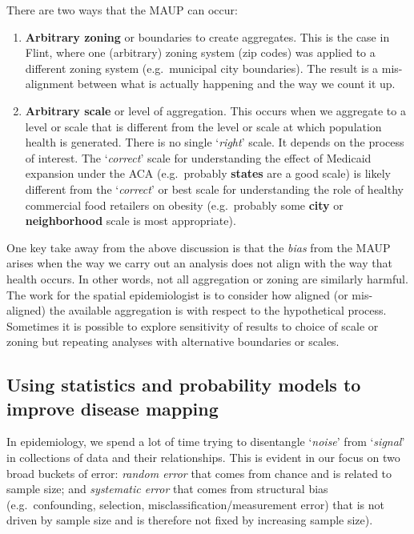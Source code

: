 \documentclass[
]{book}
\providecommand{\tightlist}{%
  \setlength{\itemsep}{0pt}\setlength{\parskip}{0pt}}
\begin{document}
There are two ways that the MAUP can occur:

\begin{enumerate}
\def\labelenumi{\arabic{enumi}.}
\tightlist
\item
  \textbf{Arbitrary zoning} or boundaries to create aggregates. This is the case in Flint, where one (arbitrary) zoning system (zip codes) was applied to a different zoning system (e.g.~municipal city boundaries). The result is a mis-alignment between what is actually happening and the way we count it up.
\item
  \textbf{Arbitrary scale} or level of aggregation. This occurs when we aggregate to a level or scale that is different from the level or scale at which population health is generated. There is no single `\emph{right}' scale. It depends on the process of interest. The `\emph{correct}' scale for understanding the effect of Medicaid expansion under the ACA (e.g.~probably \textbf{states} are a good scale) is likely different from the `\emph{correct}' or best scale for understanding the role of healthy commercial food retailers on obesity (e.g.~probably some \textbf{city} or \textbf{neighborhood} scale is most appropriate).
\end{enumerate}

One key take away from the above discussion is that the \emph{bias} from the MAUP arises when the way we carry out an analysis does not align with the way that health occurs. In other words, not all aggregation or zoning are similarly harmful. The work for the spatial epidemiologist is to consider how aligned (or mis-aligned) the available aggregation is with respect to the hypothetical process. Sometimes it is possible to explore sensitivity of results to choice of scale or zoning but repeating analyses with alternative boundaries or scales.

\hypertarget{using-statistics-and-probability-models-to-improve-disease-mapping}{%
\subsection{Using statistics and probability models to improve disease mapping}\label{using-statistics-and-probability-models-to-improve-disease-mapping}}

In epidemiology, we spend a lot of time trying to disentangle `\emph{noise}' from `\emph{signal}' in collections of data and their relationships. This is evident in our focus on two broad buckets of error: \emph{random error} that comes from chance and is related to sample size; and \emph{systematic error} that comes from structural bias (e.g.~confounding, selection, misclassification/measurement error) that is not driven by sample size and is therefore not fixed by increasing sample size).
\end{document}
